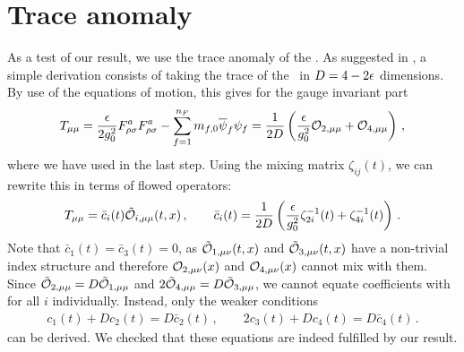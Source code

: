 \section{Trace anomaly}\label{sec:traceanom}

As a test of our result, we use the trace anomaly of the \emt. As
suggested in , a simple derivation consists of
taking the trace of the \emt\ in $D=4 - 2 \epsilon$ dimensions. By use of the
equations of motion, this gives for the gauge invariant part
\begin{equation}
	T_{\mu \mu} = \frac{\epsilon}{2 g_0^2} F_{\rho \sigma}^a F_{\rho
          \sigma}^a - \sum_{f=1}^{n_F} m_{f, 0} \overline{\psi}_f \psi_f =
        \frac{1}{2D}\left(\frac{\epsilon}{g_0^2}
        \mathcal{O}_{2,\mu\mu}+\mathcal{O}_{4,\mu\mu}\right)
        \,,
	\label{eq:EMTabare}
\end{equation}
where we have used  in the last step.
Using
the mixing matrix $\zeta_{i j}(t)$, we can rewrite this in terms of
flowed operators:
\begin{equation}
\begin{split}
  T_{\mu\mu} =  \bar c_i(t)\tilde{\mathcal{O}}_{i,\mu\mu}(t,x)\,,\qquad
  \bar c_i(t) = \frac{1}{2D}\left(
  \frac{\epsilon}{ g_0^2} \zeta_{2 i}^{-1}(t)
         + \zeta_{4 i}^{-1}(t)\right)\,.
	 \label{eq:EMTaflowed}
  \end{split}
\end{equation}
Note that $\bar{c}_1 (t) = \bar{c}_3 (t) = 0$, as $\tilde{\mathcal{O}}_{1, \mu \nu} (t, x)$
and $\tilde{\mathcal{O}}_{3, \mu \nu} (t, x)$ have a non-trivial index structure and
therefore $\mathcal{O}_{2, \mu \nu} (x)$ and $\mathcal{O}_{4, \mu \nu} (x)$ cannot
mix with them.
Since $\tilde{\mathcal{O}}_{2,\mu\mu}=D\tilde{\mathcal{O}}_{1,\mu\mu}$ and
$2\tilde{\mathcal{O}}_{4,\mu\mu}=D\tilde{\mathcal{O}}_{3,\mu\mu}$, we cannot equate coefficients
with  for all $i$ individually. Instead, only the weaker
conditions
\begin{equation}
  \begin{split}
    c_1(t)+Dc_2(t) = D\bar c_2(t)\,,\qquad
    2c_3(t)+Dc_4(t) = D\bar c_4(t)\,.
  \end{split}
\end{equation}
can be derived. We checked that these equations are indeed fulfilled by
our result.
